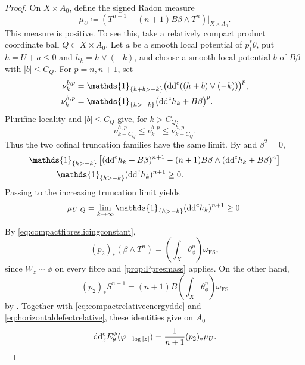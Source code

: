\begin{proof}
    On $X\times A_0$, define the signed Radon measure
    \begin{equation}\label{eq:horizontaldefectrelative}
        \mu_U\coloneqq
        \left(T^{n+1}-(n+1)B\beta\wedge T^n\right)|_{X\times A_0}.
    \end{equation}
    This measure is positive. To see this, take a relatively compact product coordinate ball $Q\subset X\times A_0$. Let $a$ be a smooth local potential of $p_1^*\theta$, put $h=U+a\leq0$ and $h_k=h\lor(-k)$, and choose a smooth local potential $b$ of $B\beta$ with $|b|\leq C_Q$. For $p=n,n+1$, set
    \[
        \begin{aligned}
        \nu_k^{b,p}&=\mathds{1}_{\{h+b>-k\}}
        \bigl(\ddc((h+b)\lor(-k))\bigr)^p,\\
        \nu_k^{h,p}&=\mathds{1}_{\{h>-k\}}
        \bigl(\ddc h_k+B\beta\bigr)^p.
        \end{aligned}
    \]
    Plurifine locality and $|b|\leq C_Q$ give, for $k>C_Q$,
    \[
        \nu_{k-C_Q}^{h,p}\leq\nu_k^{b,p}\leq\nu_{k+C_Q}^{h,p}.
    \]
    Thus the two cofinal truncation families have the same limit. By  and $\beta^2=0$,
    \begin{equation}\label{eq:horizontalfinitelevelrelative}
        \begin{aligned}
        &\mathds{1}_{\{h>-k\}}\left[
        (\ddc h_k+B\beta)^{n+1}
        -(n+1)B\beta\wedge(\ddc h_k+B\beta)^n\right]\\
        &\qquad=\mathds{1}_{\{h>-k\}}(\ddc h_k)^{n+1}\geq0.
        \end{aligned}
    \end{equation}
    Passing to the increasing truncation limit yields
    \begin{equation}\label{eq:horizontaltruncationrelative}
        \mu_U|_Q=\lim_{k\to\infty}
        \mathds{1}_{\{h>-k\}}(\ddc h_k)^{n+1}\geq0.
    \end{equation}

    By \eqref{eq:compactfibreslicingconstant},
    \[
        (p_2)_*(\beta\wedge T^n)
        =\left(\int_X\theta_\phi^n\right)\omega_{\mathrm{FS}},
    \]
    since $W_z\sim\phi$ on every fibre and \cref{prop:Ppresmass} applies. On the other hand,
    \[
        (p_2)_*S^{n+1}
        =(n+1)B\left(\int_X\theta_\phi^n\right)\omega_{\mathrm{FS}}
    \]
    by . Together with \eqref{eq:compactrelativeenergyddc} and \eqref{eq:horizontaldefectrelative}, these identities give on $A_0$
    \begin{equation}\label{eq:relativeenergycurvature}
        \mathrm{dd}^{\mathrm{c}}_z E_\theta^\phi(\varphi_{-\log|z|})
        =\frac{1}{n+1}(p_2)_*\mu_U.
    \end{equation}


\end{proof}
